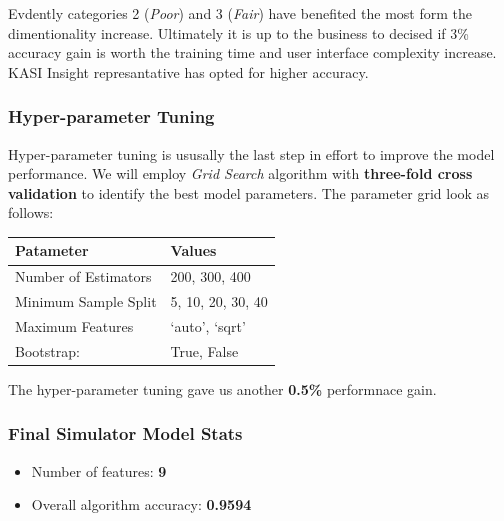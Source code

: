 Evdently categories 2 (\emph{Poor}) and 3 (\emph{Fair}) have benefited
the most form the dimentionality increase. Ultimately it is up to the
business to decised if 3\% accuracy gain is worth the training time and
user interface complexity increase. KASI Insight represantative has
opted for higher accuracy.

\hypertarget{hyper-parameter-tuning}{%
\subsubsection{Hyper-parameter Tuning}\label{hyper-parameter-tuning}}

Hyper-parameter tuning is ususally the last step in effort to improve
the model performance. We will employ \emph{Grid Search} algorithm with
\textbf{three-fold cross validation} to identify the best model
parameters. The parameter grid look as follows:

\begin{longtable}[]{@{}ll@{}}
\toprule
Patameter & Values\tabularnewline
\midrule
\endhead
Number of Estimators & 200, 300, 400\tabularnewline
Minimum Sample Split & 5, 10, 20, 30, 40\tabularnewline
Maximum Features & `auto', `sqrt'\tabularnewline
Bootstrap: & True, False\tabularnewline
\bottomrule
\end{longtable}

The hyper-parameter tuning gave us another \textbf{0.5\%} performnace
gain.

\hypertarget{final-simulator-model-stats}{%
\subsubsection{Final Simulator Model
Stats}\label{final-simulator-model-stats}}

\begin{itemize}
\tightlist
\item
  Number of features: \textbf{9}
\item
  Overall algorithm accuracy: \textbf{0.9594}
\end{itemize}

